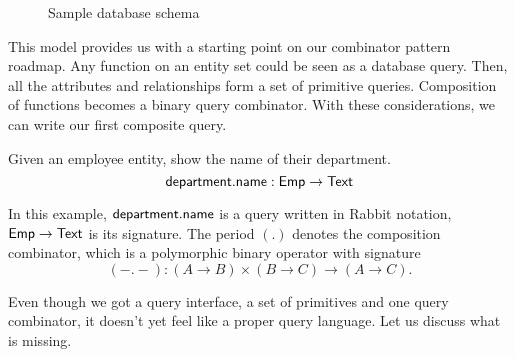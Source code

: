 \begin{figure}
    \label{fig:sample-schema}
    \centering
    \caption{Sample database schema}
\end{figure}

This model provides us with a starting point on our combinator pattern roadmap.
Any function on an entity set could be seen as a database query.  Then, all the
attributes and relationships form a set of primitive queries.  Composition of
functions becomes a binary query combinator.  With these considerations, we can
write our first composite query.

\begin{example}
    Given an employee entity, show the name of their department.
    \begin{equation*}
        \textup{\textsf{department}}{.}\textup{\textsf{name}}: \textup{\textsf{Emp}} \to \textup{\textsf{Text}}
    \end{equation*}
\end{example}

In this example, $\textup{\textsf{department}}{.}\textup{\textsf{name}}$ is a query written in Rabbit notation,
$\textup{\textsf{Emp}} \to \textup{\textsf{Text}}$ is its signature.  The period $({.})$ denotes the composition
combinator, which is a polymorphic binary operator with signature
\begin{equation*}
        (-{.}-) : (A \to B) \times (B \to C) \to (A \to C).
\end{equation*}

Even though we got a query interface, a set of primitives and one query
combinator, it doesn't yet feel like a proper query language.  Let us discuss
what is missing.

